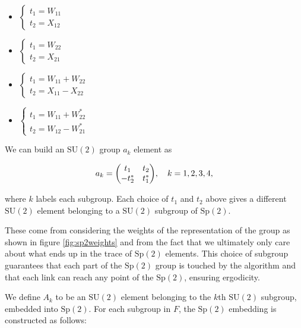 \documentclass[reqno,12pt]{article}
\numberwithin{equation}{section}
\newcommand{\SU}{\mathrm{SU}}
\newcommand{\Sp}{\mathrm{Sp}}
\begin{document}
\begin{itemize}
	\item $\begin{cases} t_1 = W_{11} \\ t_2 = X_{12} \end{cases}$
	\item $\begin{cases} t_1 = W_{22} \\ t_2 = X_{21} \end{cases}$
	\item $\begin{cases} t_1 = W_{11} + W_{22} \\ t_2 = X_{11} - X_{22} \end{cases}$
	\item $\begin{cases} t_1 = W_{11} + W^*_{22} \\ t_2 = W_{12} - W^*_{21} \end{cases}$
\end{itemize}

We can build an $\SU(2)$ group $a_k$ element as

\begin{equation} \label{eq:su2element}
	a_k = \mqty(t_1 & t_2 \\ -t_2^* & t_1^*) \qc k = 1, 2, 3, 4,
\end{equation}

where $k$ labels each subgroup. 
Each choice of $t_1$ and $t_2$ above gives a different $\SU(2)$ element belonging to a $\SU(2)$ subgroup of $\Sp(2)$.

These come from considering the weights of the representation of the group as shown in figure \ref{fig:sp2weights} and from
the fact that we ultimately only care about what ends up in the trace of $\Sp(2)$ elements. This choice of subgroup
guarantees that each part of the $\Sp(2)$ group is touched by the algorithm and that each link can reach any point
of the $\Sp(2)$, ensuring ergodicity.

We define $A_k$ to be an $\SU(2)$ element belonging to the $k$th $\SU(2)$ subgroup, embedded into $\Sp(2)$. 
For each subgroup in $F$, the $\Sp(2)$ embedding is constructed as follows:
\end{document}
